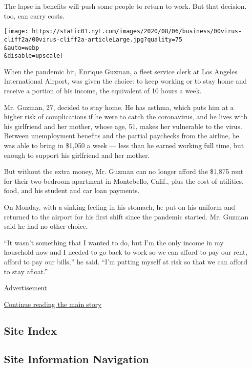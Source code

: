The lapse in benefits will push some people to return to work. But that
decision, too, can carry costs.

\texttt{[image: https://static01.nyt.com/images/2020/08/06/business/00virus-cliff2a/00virus-cliff2a-articleLarge.jpg?quality=75\\\&auto=webp\\\&disable=upscale]}

When the pandemic hit, Enrique Guzman, a fleet service clerk at Los
Angeles International Airport, was given the choice: to keep working or
to stay home and receive a portion of his income, the equivalent of 10
hours a week.

Mr. Guzman, 27, decided to stay home. He has asthma, which puts him at a
higher risk of complications if he were to catch the coronavirus, and he
lives with his girlfriend and her mother, whose age, 51, makes her
vulnerable to the virus. Between unemployment benefits and the partial
paychecks from the airline, he was able to bring in \$1,050 a week ---
less than he earned working full time, but enough to support his
girlfriend and her mother.

But without the extra money, Mr. Guzman can no longer afford the \$1,875
rent for their two-bedroom apartment in Montebello, Calif., plus the
cost of utilities, food, and his student and car loan payments.

On Monday, with a sinking feeling in his stomach, he put on his uniform
and returned to the airport for his first shift since the pandemic
started. Mr. Guzman said he had no other choice.

``It wasn't something that I wanted to do, but I'm the only income in my
household now and I needed to go back to work so we can afford to pay
our rent, afford to pay our bills,'' he said. ``I'm putting myself at
risk so that we can afford to stay afloat.''

Advertisement

\protect\hyperlink{after-bottom}{Continue reading the main story}

\hypertarget{site-index}{%
\subsection{Site Index}\label{site-index}}

\hypertarget{site-information-navigation}{%
\subsection{Site Information
Navigation}\label{site-information-navigation}}

